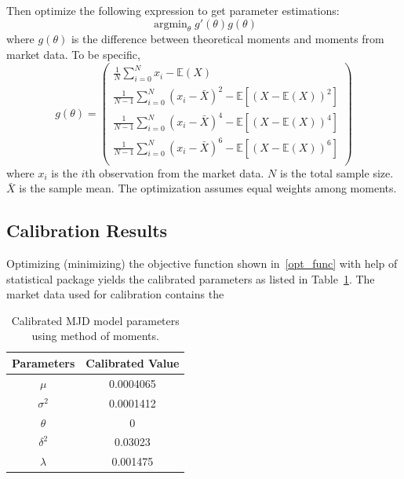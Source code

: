 \documentclass[11pt,reqno,final]{amsart}
\DeclareMathOperator*{\argmin}{arg min}
\begin{document}
Then optimize the following expression to get parameter estimations:
\begin{equation} \label{opt_func}
\argmin_{\theta} g'(\theta) g(\theta)
\end{equation}
where $g(\theta)$ is the difference between theoretical moments and moments from market data. To be specific,
$$
g(\theta) = \left(
              \begin{array}{c}
                \frac{1}{N}\sum_{i=0}^N x_{i} - \mathbb{E}(X)  \\
                \frac{1}{N-1}\sum_{i=0}^N(x_{i} - \bar{X})^2 - \mathbb{E}[(X-\mathbb{E}(X))^{2}]  \\
                \frac{1}{N-1}\sum_{i=0}^N(x_{i} - \bar{X})^4 - \mathbb{E}[(X-\mathbb{E}(X))^{4}] \\
                \frac{1}{N-1}\sum_{i=0}^N(x_{i} - \bar{X})^6 - \mathbb{E}[(X-\mathbb{E}(X))^{6}] \\
              \end{array}
            \right)
$$
where $x_i$ is the $i$th observation from the market data. $N$ is the total sample size. $\bar{X}$ is the sample mean. The optimization assumes equal weights among moments.

\subsection{Calibration Results}
Optimizing (minimizing) the objective function shown in~\ref{opt_func} with help of statistical package yields the calibrated parameters as listed in Table~\ref{tbl::gmm_calibration_parameter}. The market data used for calibration contains the

\begin{table}[H]
\begin{center}
\caption{Calibrated MJD model parameters using method of moments.}
\begin{tabular}{c|c}
  \hline \hline
  Parameters & Calibrated Value \\ \hline
  $\mu$ & 0.0004065 \\
  $\sigma^2$ & 0.0001412 \\
  $\theta$ & 0 \\
  $\delta^2$ & 0.03023 \\
  $\lambda$ & 0.001475 \\
  \hline\hline
\end{tabular}\label{tbl::gmm_calibration_parameter}
\end{center}
\end{table}
\end{document}

